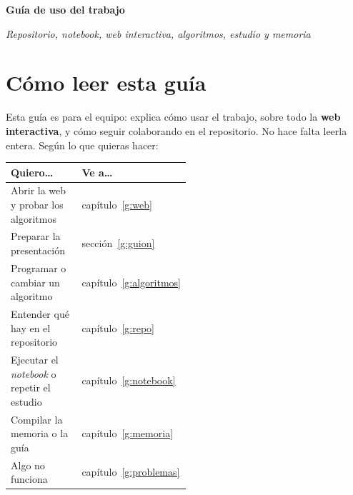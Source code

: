\documentclass[11pt,a4paper,twoside,openany]{report}
\begin{document}
\begin{titlepage}
  \thispagestyle{empty}
  \centering
  \vspace*{2.6cm}
  {\large\scshape\color{gris}\asignatura\par}
  \vspace{2.2cm}
  {\fontsize{28}{34}\selectfont\bfseries\color{tinta}Guía de uso del trabajo\par}
  \vspace{0.8cm}
  {\Large\color{azul}\titulotrabajo\par}
  \vspace{1.0cm}
  {\large\itshape\color{gris}Repositorio, \emph{notebook}, web interactiva, algoritmos, estudio y memoria\par}
  \vspace{2.0cm}
  \vspace{2.2cm}

  {\Large\autorestrabajo\par}
  \vfill
  {\large\fechatrabajo\par}
\end{titlepage}

\chapter*{Cómo leer esta guía}
Esta guía es para el equipo: explica cómo usar el trabajo, sobre todo la \textbf{web interactiva}, y cómo seguir colaborando en el repositorio. No hace falta leerla entera. Según lo que quieras hacer:

\begin{center}
\small
\begin{tabularx}{0.95\linewidth}{@{}>{\raggedright\arraybackslash}p{0.5\linewidth} X@{}}
  \toprule
  Quiero\dots & Ve a\dots \\
  \midrule
  Abrir la web y probar los algoritmos & capítulo~\ref{g:web} \\
  Preparar la presentación & sección~\ref{g:guion} \\
  Programar o cambiar un algoritmo & capítulo~\ref{g:algoritmos} \\
  Entender qué hay en el repositorio & capítulo~\ref{g:repo} \\
  Ejecutar el \emph{notebook} o repetir el estudio & capítulo~\ref{g:notebook} \\
  Compilar la memoria o la guía & capítulo~\ref{g:memoria} \\
  Algo no funciona & capítulo~\ref{g:problemas} \\
  \bottomrule
\end{tabularx}
\end{center}
\end{document}
